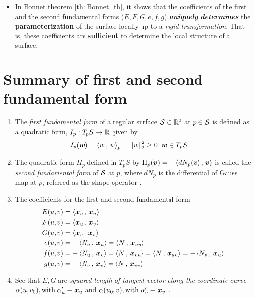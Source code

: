 \documentclass[11pt]{article}
\begin{document}
\begin{itemize}
\item In Bonnet theorem \ref{th: Bonnet_th}, it shows that the coefficients of the first and the second fundamental forms ($E,F,G,e,f,g$) \emph{\textbf{uniquely determines}} the \textbf{parameterization} of the surface locally up to a \emph{rigid transformation}. That is, these coefficients are \textbf{sufficient} to determine the local structure of a surface.  

\end{itemize}
\section{Summary of first and second fundamental form}
\begin{enumerate}
\item The \emph{first fundamental form} \citep{do1976differential} of a regular surface ${\mathcal S}\subset {\mathbb R}^{3}$ at $p\in {\mathcal S}$ is defined as a  quadratic form,  $I_{p}: T_{p}S \rightarrow {\mathbb R}$ given by 
\begin{align*}
I_{p}(\boldsymbol{w}) &= \left\langle w\,,\, w \right\rangle_{p} = \left\|w\right\|_{2}^{2} \ge 0\; \; \boldsymbol{w}\in T_{p}S.
\end{align*}

\item  The quadratic form $\Pi_{p}$ defined in $T_{p}S$ by $\Pi_{p}(\boldsymbol{v}) = -\left\langle dN_{p}(\boldsymbol{v})\,,\, \boldsymbol{v} \right\rangle$ is called the \emph{second fundamental form} of ${\mathcal S}$ at $p$, where $dN_{p}$ is the differential of Gauss map at $p$, referred as the shape operator \citep{o2006elementary}. 

\item The coefficients for the first and second fundamental form
\begin{align}
E(u,v) &= \left\langle \boldsymbol{x}_{u}\,,\, \boldsymbol{x}_{u} \right\rangle \nonumber\\
F(u,v) &= \left\langle \boldsymbol{x}_{u}\,,\, \boldsymbol{x}_{v} \right\rangle \nonumber\\
G(u,v) &= \left\langle \boldsymbol{x}_{v}\,,\, \boldsymbol{x}_{v} \right\rangle \nonumber \\
e(u,v)  &=  - \left\langle N_{u}\,,\, \boldsymbol{x}_{u} \right\rangle = \left\langle N\,,\, \boldsymbol{x}_{uu} \right\rangle \nonumber\\
f(u, v)&= - \left\langle N_{u}\,,\, \boldsymbol{x}_{v} \right\rangle =  \left\langle N\,,\, \boldsymbol{x}_{vu} \right\rangle =  \left\langle N\,,\, \boldsymbol{x}_{uv} \right\rangle =  -\left\langle N_{v}\,,\, \boldsymbol{x}_{u} \right\rangle\nonumber\\
g(u, v)&=   - \left\langle N_{v}\,,\, \boldsymbol{x}_{v} \right\rangle = \left\langle N\,,\, \boldsymbol{x}_{vv} \right\rangle \label{eqn: coeff_first_sec_fund_form}
\end{align}

\item See that $E,G$ are \emph{squared length of tangent vector along the coordinate curve} $\alpha(u, v_{0}), \text{with }\alpha_{u}' \equiv \boldsymbol{x}_{u}$ and $\alpha(u_{0}, v), \text{with }\alpha_{v}' \equiv \boldsymbol{x}_{v}$ .


\end{enumerate}
\end{document}
